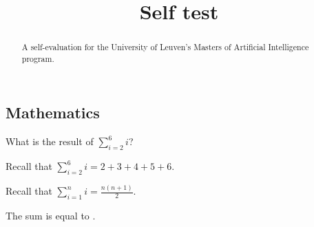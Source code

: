 \documentclass{ximera}
\title{Self test}
\begin{document}
\begin{abstract}
A self-evaluation for the University of Leuven's Masters of Artificial
Intelligence program.
\end{abstract}
\maketitle

\subsection*{Mathematics}

\begin{question}
What is the result of $\sum_{i=2}^6 i$?
\begin{solution}
\begin{hint}
Recall that $\sum_{i=2}^6 i = 2 + 3 + 4 + 5 + 6$.
\end{hint}
\begin{hint}
Recall that $\sum_{i=1}^n i = \frac{n(n+1)}{2}$.
\end{hint}
The sum is equal to .
\end{solution}
\end{question}
\end{document}
